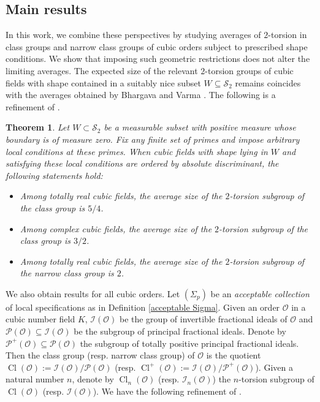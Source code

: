\documentclass[table]{amsart}
\newtheorem{lthm}{Theorem}
\newcommand{\cO}{\mathcal{O}}
\newcommand{\op}[1]{\operatorname{#1}}
\numberwithin{equation}{section}
\begin{document}
\subsection{Main results}
In this work, we combine these perspectives by studying averages of $2$-torsion
in class groups and narrow class groups of cubic orders subject to prescribed
shape conditions. We show that imposing such geometric restrictions does not
alter the limiting averages. The expected size of the relevant $2$-torsion
groups of cubic fields with shape contained in a suitably nice subset $W\subseteq \mathcal{S}_2$ remains coincides with the averages obtained by Bhargava and Varma \cite{BhargavaVarma}. The following is a refinement of \cite[Theorem 1]{BhargavaVarma}.
\begin{lthm}\label{thm a}
    Let $W \subset \mathcal{S}_2$ be a measurable subset with positive measure whose boundary is of measure
zero. Fix any finite set of primes and impose arbitrary
local conditions at these primes. When cubic fields with shape lying in $W$ and
satisfying these local conditions are ordered by absolute discriminant, the
following statements hold:
\begin{itemize}
\item[(a)] Among totally real cubic fields, the average size of the
$2$-torsion subgroup of the class group is $5/4$.
\item[(b)] Among complex cubic fields, the average size of the
$2$-torsion subgroup of the class group is $3/2$.
\item[(c)] Among totally real cubic fields, the average size of the
$2$-torsion subgroup of the narrow class group is $2$.
\end{itemize}

\end{lthm}

We also obtain results for all cubic orders. Let $(\Sigma_p)$ be an \emph{acceptable collection} of local specifications as in Definition \ref{acceptable Sigma}. Given an order $\cO$ in a cubic number field $K$, $\mathcal{I}(\cO)$ be the group of invertible fractional ideals of $\cO$ and $\mathcal{P}(\mathcal{O})\subseteq \mathcal{I}(\cO)$ be the subgroup of principal fractional ideals. Denote by $\mathcal{P}^+(\cO)
\subseteq \mathcal{P}(\mathcal{O})$ the subgroup of totally positive principal fractional ideals. Then the class group (resp. narrow class group) of $\cO$ is the quotient $\op{Cl}(\cO):=\mathcal{I}(\cO)/\mathcal{P}(\mathcal{O})$ (resp. $\op{Cl}^+(\cO):=\mathcal{I}(\cO)/\mathcal{P}^+(\mathcal{O})$). Given a natural number $n$, denote by $\op{Cl}_n(\cO)$ (resp. $\mathcal{I}_n(\cO)$) the $n$-torsion subgroup of $\op{Cl}(\cO)$ (resp. $\mathcal{I}(\cO)$). We have the following refinement of \cite[Theorem 2]{BhargavaVarma}.
\end{document}

